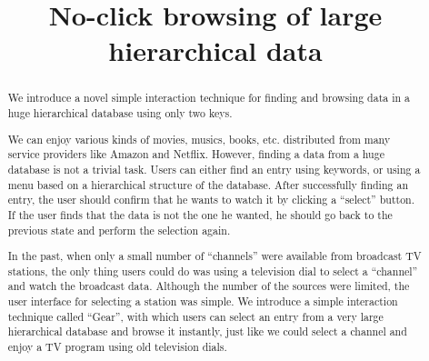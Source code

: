 \documentclass[conference]{IEEEtran}
\begin{document}
\title{No-click browsing of large hierarchical data}
%
%

\author{
\and
{}
}

\maketitle

\begin{abstract}
We introduce a novel simple interaction technique for finding and browsing
data in a huge hierarchical database using only two keys.

We can enjoy various kinds of movies, musics, books,
etc. distributed from many service providers like Amazon and Netflix.
However, 
finding a data from a huge database is not a trivial task. Users can
either find an entry using keywords, or using a menu based
on a hierarchical structure of the database.
After successfully finding an entry,
the user should confirm that he wants to watch it by clicking a ``select'' button.
If the user finds that the data is not the one he wanted,
he should go back to the previous state and perform the selection again.

In the past, when only a small number of ``channels'' were available
from broadcast TV stations, the only thing users could do was
using a television dial to select a ``channel'' and watch the
broadcast data.
Although the number of the sources were limited,
the user interface for selecting a station was simple.
%
We introduce a simple interaction technique called ``Gear'',
with which users can select an entry from a very large hierarchical database and
browse it instantly, just like we could select a channel and enjoy a TV program
using old television dials.
\end{abstract}
\end{document}
